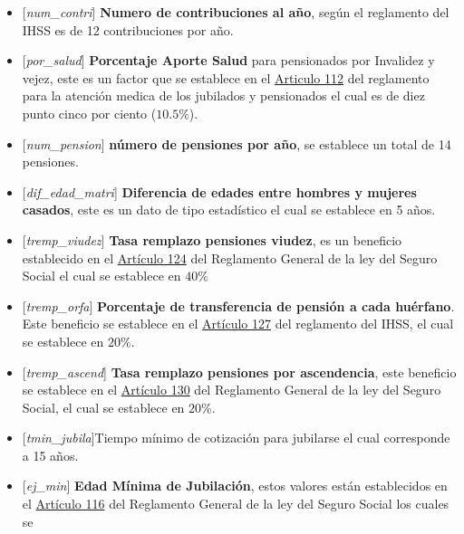 \documentclass[
  letterpaper,
  DIV=11,
  numbers=noendperiod]{scrreprt}
\begin{document}
\begin{itemize}
\item
  {[}\emph{num\_contri}{]} \textbf{Numero de contribuciones al año},
  según el reglamento del IHSS es de 12 contribuciones por año.
\item
  {[}\emph{por\_salud}{]} \textbf{Porcentaje Aporte Salud} para
  pensionados por Invalidez y vejez, este es un factor que se establece
  en el
  \href{https://www.ilo.org/dyn/travail/docs/930/Reglamento\%20General\%20de\%20la\%20\%20Ley\%20del\%20IHSS.pdf}{Articulo
  112} del reglamento para la atención medica de los jubilados y
  pensionados el cual es de diez punto cinco por ciento (\(10.5\%\)).
\item
  {[}\emph{num\_pension}{]} \textbf{número de pensiones por año}, se
  establece un total de 14 pensiones.
\item
  {[}\emph{dif\_edad\_matri}{]} \textbf{Diferencia de edades entre
  hombres y mujeres casados}, este es un dato de tipo estadístico el
  cual se establece en 5 años.
\item
  {[}\emph{tremp\_viudez}{]} \textbf{Tasa remplazo pensiones viudez}, es
  un beneficio establecido en el
  \href{https://www.ilo.org/dyn/travail/docs/930/Reglamento\%20General\%20de\%20la\%20\%20Ley\%20del\%20IHSS.pdf}{Artículo
  124} del Reglamento General de la ley del Seguro Social el cual se
  establece en \(40\%\)
\item
  {[}\emph{tremp\_orfa}{]} \textbf{Porcentaje de transferencia de
  pensión a cada huérfano}. Este beneficio se establece en el
  \href{https://www.ilo.org/dyn/travail/docs/930/Reglamento\%20General\%20de\%20la\%20\%20Ley\%20del\%20IHSS.pdf}{Artículo
  127} del reglamento del IHSS, el cual se establece en \(20\%\).
\item
  {[}\emph{tremp\_ascend}{]} \textbf{Tasa remplazo pensiones por
  ascendencia}, este beneficio se establece en el
  \href{https://www.ilo.org/dyn/travail/docs/930/Reglamento\%20General\%20de\%20la\%20\%20Ley\%20del\%20IHSS.pdf}{Artículo
  130} del Reglamento General de la ley del Seguro Social, el cual se
  establece en \(20\%\).
\item
  {[}\emph{tmin\_jubila}{]}Tiempo mínimo de cotización para jubilarse el
  cual corresponde a 15 años.
\item
  {[}\emph{ej\_min}{]} \textbf{Edad Mínima de Jubilación}, estos valores
  están establecidos en el
  \href{https://www.ilo.org/dyn/travail/docs/930/Reglamento\%20General\%20de\%20la\%20\%20Ley\%20del\%20IHSS.pdf}{Artículo
  116} del Reglamento General de la ley del Seguro Social los cuales se

\end{itemize}
\end{document}
